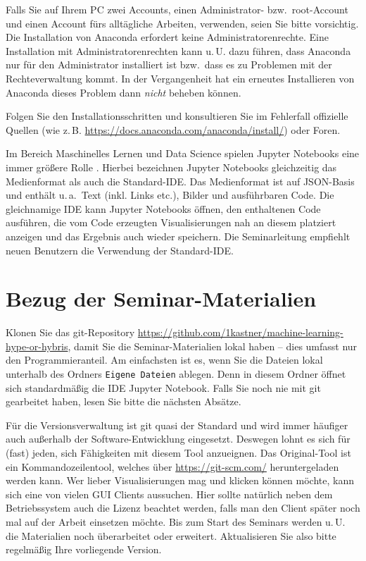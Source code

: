 \documentclass{tufte-handout}
\begin{document}
Falls Sie auf Ihrem PC zwei Accounts, einen Administrator- bzw.\ root-Account und einen Account fürs alltägliche Arbeiten, verwenden, seien Sie bitte vorsichtig.
Die Installation von Anaconda erfordert keine Administratorenrechte.
Eine Installation mit Administratorenrechten kann u.\,U. dazu führen, dass Anaconda nur für den Administrator installiert ist bzw.\ dass es zu Problemen mit der Rechteverwaltung kommt.
In der Vergangenheit hat ein erneutes Installieren von Anaconda dieses Problem dann \emph{nicht} beheben können.

Folgen Sie den Installationsschritten und konsultieren Sie im Fehlerfall offizielle Quellen (wie z.\,B. \url{https://docs.anaconda.com/anaconda/install/}) oder Foren.

Im Bereich Maschinelles Lernen und Data Science spielen Jupyter Notebooks eine immer größere Rolle%
\cite{perkel_why_2018,hiltch_jupyter_2019}.
Hierbei bezeichnen Jupyter Notebooks gleichzeitig das Medienformat als auch die Standard-IDE.
Das Medienformat ist auf JSON-Basis und enthält u.\,a.\ Text (inkl. Links etc.), Bilder und ausführbaren Code.
Die gleichnamige IDE kann Jupyter Notebooks öffnen, den enthaltenen Code ausführen, die vom Code erzeugten Visualisierungen nah an diesem platziert anzeigen und das Ergebnis auch wieder speichern.
Die Seminarleitung empfiehlt neuen Benutzern die Verwendung der Standard-IDE.


\section{Bezug der Seminar-Materialien}

Klonen Sie das git-Repository
\url{https://github.com/1kastner/machine-learning-hype-or-hybris},
damit Sie die Seminar-Materialien lokal haben -- dies umfasst nur den Programmieranteil.
Am einfachsten ist es, wenn Sie die Dateien lokal unterhalb des Ordners \texttt{Eigene Dateien} ablegen.
Denn in diesem Ordner öffnet sich standardmäßig die IDE Jupyter Notebook.
Falls Sie noch nie mit git gearbeitet haben, lesen Sie bitte die nächsten Absätze.

Für die Versionsverwaltung ist git quasi der Standard und wird immer häufiger auch außerhalb der Software-Entwicklung eingesetzt.
Deswegen lohnt es sich für (fast) jeden, sich Fähigkeiten mit diesem Tool anzueignen.
Das Original-Tool ist ein Kommandozeilentool, welches über \url{https://git-scm.com/} heruntergeladen werden kann.
Wer lieber Visualisierungen mag und klicken können möchte, kann sich eine von vielen GUI Clients%
aussuchen.
Hier sollte natürlich neben dem Betriebssystem auch die Lizenz beachtet werden, falls man den Client später noch mal auf der Arbeit einsetzen möchte.
Bis zum Start des Seminars werden u.\,U. die Materialien noch überarbeitet oder erweitert.
Aktualisieren Sie also bitte regelmäßig Ihre vorliegende Version.
\end{document}
